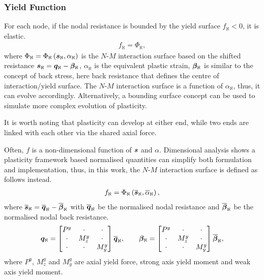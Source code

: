 \subsubsection{Yield Function}
For each node, if the nodal resistance is bounded by the yield surface $f_\aleph<0$, it is elastic.
\begin{gather}
f_\aleph=\Phi_\aleph,
\end{gather}
where $\Phi_\aleph=\Phi_\aleph\left(\bm{s}_\aleph,\alpha_\aleph\right)$ is the $N$-$M$ interaction surface based on the shifted resistance $\bm{s}_\aleph=\bm{q}_\aleph-\bm{\beta}_\aleph$, $\alpha_\aleph$ is the equivalent plastic strain, $\bm{\beta}_\aleph$ is similar to the concept of back stress, here back resistance that defines the centre of interaction/yield surface. The $N$-$M$ interaction surface is a function of $\alpha_\aleph$, thus, it can evolve accordingly. Alternatively, a bounding surface concept can be used to simulate more complex evolution of plasticity.

It is worth noting that plasticity can develop at either end, while two ends are linked with each other via the shared axial force.

Often, $f$ is a non-dimensional function of $\bm{s}$ and $\alpha$. Dimensional analysis shows a plasticity framework based normalised quantities can simplify both formulation and implementation, thus, in this work, the $N$-$M$ interaction surface is defined as follows instead.
\begin{gather}
f_\aleph=\Phi_\aleph\left(\bm{\overline{s}}_\aleph,\overline{\alpha}_\aleph\right),
\end{gather}
where $\bm{\overline{s}}_\aleph=\bm{\overline{q}}_\aleph-\overline{\bm{\beta}}_\aleph$ with $\bm{\overline{q}}_\aleph$ be the normalised nodal resistance and $\overline{\bm{\beta}}_\aleph$ be the normalised nodal back resistance.
\begin{gather}
\bm{q}_\aleph=\begin{bmatrix}
P^y&\cdot&\cdot\\\cdot&M_z^y&\cdot\\\cdot&\cdot&M_y^y
\end{bmatrix}\bm{\overline{q}}_\aleph,\qquad
\bm{\beta}_\aleph=\begin{bmatrix}
P^y&\cdot&\cdot\\\cdot&M_z^y&\cdot\\\cdot&\cdot&M_y^y
\end{bmatrix}\overline{\bm{\beta}}_\aleph,
\end{gather}
where $P^y$, $M_z^y$ and $M_y^y$ are axial yield force, strong axis yield moment and weak axis yield moment.
